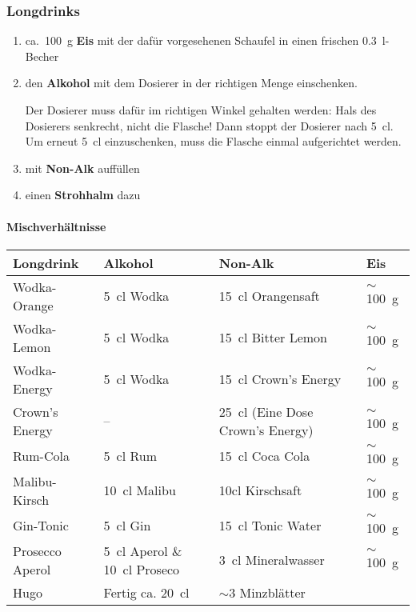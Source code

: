 \subsubsection{Longdrinks}
\begin{enumerate}
    \item ca.\ \SI{100}{\gram} \textbf{Eis} mit der dafür vorgesehenen Schaufel in einen frischen \SI{0.3}{\litre}-Becher
    \item den \textbf{Alkohol} mit dem Dosierer in der richtigen Menge einschenken.

        Der Dosierer muss dafür im richtigen Winkel gehalten werden: Hals des Dosierers senkrecht, nicht die Flasche! Dann stoppt der Dosierer nach \SI{5}{\centi\litre}. Um erneut \SI{5}{\centi\litre} einzuschenken, muss die Flasche einmal aufgerichtet werden.
    \item mit \textbf{Non-Alk} auffüllen
    \item einen \textbf{Strohhalm} dazu
\end{enumerate}

\paragraph{Mischverhältnisse}
\begin{center}
    \begin{tabular}{llll}
        Longdrink & Alkohol & Non-Alk & Eis \\ \hline\hline
        Wodka-Orange &  \SI{5}{\centi\litre} Wodka & \SI{15}{\centi\litre} Orangensaft & $\sim$\SI{100}{\gram} \\ \hline
        Wodka-Lemon & \SI{5}{\centi\litre} Wodka & \SI{15}{\centi\litre} Bitter Lemon & $\sim$\SI{100}{\gram} \\ \hline
        Wodka-Energy & \SI{5}{\centi\litre} Wodka & \SI{15}{\centi\litre} Crown's Energy & $\sim$\SI{100}{\gram} \\ \hline
        Crown's Energy & -- & \SI{25}{\centi\litre} (Eine Dose Crown's Energy) & $\sim$\SI{100}{\gram} \\ \hline
        Rum-Cola & \SI{5}{\centi\litre} Rum & \SI{15}{\centi\litre} Coca Cola & $\sim$\SI{100}{\gram} \\ \hline
        Malibu-Kirsch & \SI{10}{\centi\litre} Malibu & 10cl Kirschsaft & $\sim$\SI{100}{\gram} \\ \hline
        Gin-Tonic & \SI{5}{\centi\litre} Gin & \SI{15}{\centi\litre} Tonic Water & $\sim$\SI{100}{\gram} \\ \hline
        Prosecco Aperol & \SI{5}{\centi\litre} Aperol \& \SI{10}{\centi\litre} Proseco & \SI{3}{\centi\litre} Mineralwasser & $\sim$\SI{100}{\gram} \\ \hline
        Hugo & Fertig ca. \SI{20}{\centi\litre} & $\sim$3 Minzblätter
    \end{tabular}
\end{center}

